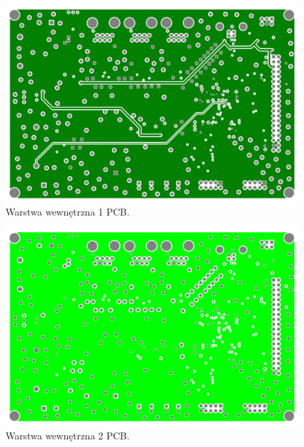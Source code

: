 \begin{figure}
    \begin{center}
        \includegraphics[width = 15cm]{zalaczniki/kontroler/Kontroler_Strona_12.jpg}
        \caption{Warstwa wewnętrzna 1 PCB.}
    \end{center}
\end{figure}

\begin{figure}
    \begin{center}
        \includegraphics[width = 15cm]{zalaczniki/kontroler/Kontroler_Strona_13.jpg}
        \caption{Warstwa wewnętrzna 2 PCB.}
    \end{center}
\end{figure}

